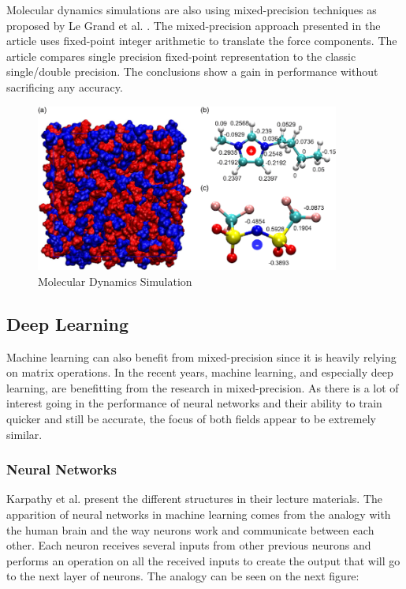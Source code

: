 Molecular dynamics simulations are also using mixed-precision techniques as proposed by Le Grand et al. \cite{LeGrand2013}. The mixed-precision approach presented in the article uses fixed-point integer arithmetic to translate the force components. The article compares single precision fixed-point representation to the classic single/double precision. The conclusions show a gain in performance without sacrificing any accuracy.

\begin{figure}[htbp]
	\centering
		\includegraphics[width=10cm]{Figures/MolecularSim.png}
	\caption[Molecular Dynamics Simulation]{Molecular Dynamics Simulation \cite{Feng2019}}
	\label{fig:MolecularSim}
\end{figure}


\subsection{Deep Learning}

Machine learning can also benefit from mixed-precision since it is heavily relying on matrix operations. In the recent years, machine learning, and especially deep learning, are benefitting from the research in mixed-precision. As there is a lot of interest going in the performance of neural networks and their ability to train quicker and still be accurate, the focus of both fields appear to be extremely similar.


\subsubsection{Neural Networks}

 Karpathy et al. \cite{Karpathy2015} present the different structures in their lecture materials. The apparition of neural networks in machine learning comes from the analogy with the human brain and the way neurons work and communicate between each other. Each neuron receives several inputs from other previous neurons and performs an operation on all the received inputs to create the output that will go to the next layer of neurons. The analogy can be seen on the next figure:

